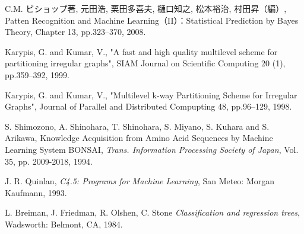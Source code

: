 \begin{thebibliography}{9}
C.M. ビショップ著, 元田浩, 栗田多喜夫, 樋口知之, 松本裕治, 村田昇（編）, Patten Recognition and Machine Learning（II）：Statistical Prediction by Bayes Theory, Chapter 13, pp.323--370, 2008.

Karypis, G. and Kumar, V., "A fast and high quality multilevel scheme for partitioning irregular graphs", SIAM Journal on Scientific Computing 20 (1), pp.359--392, 1999.

Karypis, G. and Kumar, V., "Multilevel k-way Partitioning Scheme for Irregular Graphs",
Journal of Parallel and Distributed Compupting 48, pp.96--129, 1998.

S. Shimozono, A. Shinohara, T. Shinohara, S. Miyano, S. Kuhara and S. Arikawa,
Knowledge Acquisition from Amino Acid Sequences by Machine Learning System
BONSAI, {\em Trans. Information Processing Society of Japan},
Vol. 35, pp. 2009-2018, 1994.

J. R. Quinlan, {\em C4.5: Programs for Machine Learning}, San Meteo: Morgan Kaufmann, 1993.

L. Breiman, J. Friedman, R. Olshen, C. Stone
{\em  Classification and regression trees},
Wadsworth: Belmont, CA, 1984.

\end{thebibliography}


